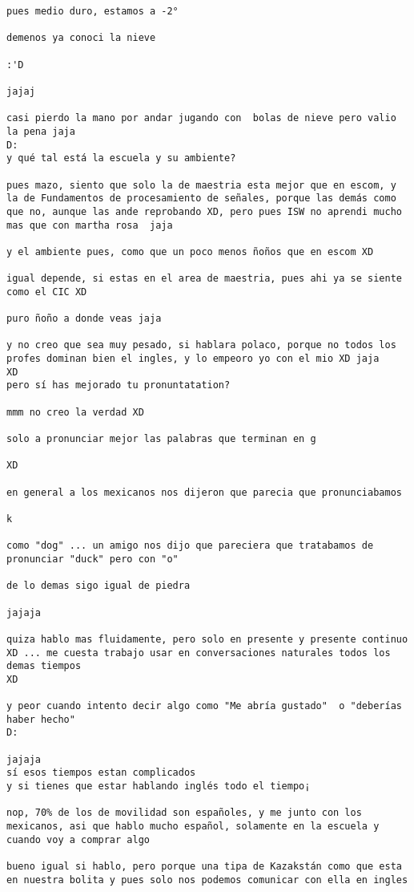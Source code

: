 \begin{verbatim}
pues medio duro, estamos a -2°

demenos ya conoci la nieve

:'D

jajaj

casi pierdo la mano por andar jugando con  bolas de nieve pero valio la pena jaja
D:
y qué tal está la escuela y su ambiente?

pues mazo, siento que solo la de maestria esta mejor que en escom, y la de Fundamentos de procesamiento de señales, porque las demás como que no, aunque las ande reprobando XD, pero pues ISW no aprendi mucho mas que con martha rosa  jaja

y el ambiente pues, como que un poco menos ñoños que en escom XD

igual depende, si estas en el area de maestria, pues ahi ya se siente como el CIC XD

puro ñoño a donde veas jaja

y no creo que sea muy pesado, si hablara polaco, porque no todos los profes dominan bien el ingles, y lo empeoro yo con el mio XD jaja
XD
pero sí has mejorado tu pronuntatation?

mmm no creo la verdad XD

solo a pronunciar mejor las palabras que terminan en g

XD

en general a los mexicanos nos dijeron que parecia que pronunciabamos

k

como "dog" ... un amigo nos dijo que pareciera que tratabamos de pronunciar "duck" pero con "o"

de lo demas sigo igual de piedra

jajaja

quiza hablo mas fluidamente, pero solo en presente y presente continuo XD ... me cuesta trabajo usar en conversaciones naturales todos los demas tiempos
XD

y peor cuando intento decir algo como "Me abría gustado"  o "deberías haber hecho"
D:

jajaja
sí esos tiempos estan complicados
y si tienes que estar hablando inglés todo el tiempo¡

nop, 70% de los de movilidad son españoles, y me junto con los mexicanos, asi que hablo mucho español, solamente en la escuela y cuando voy a comprar algo

bueno igual si hablo, pero porque una tipa de Kazakstán como que esta en nuestra bolita y pues solo nos podemos comunicar con ella en ingles


\end{verbatim}
